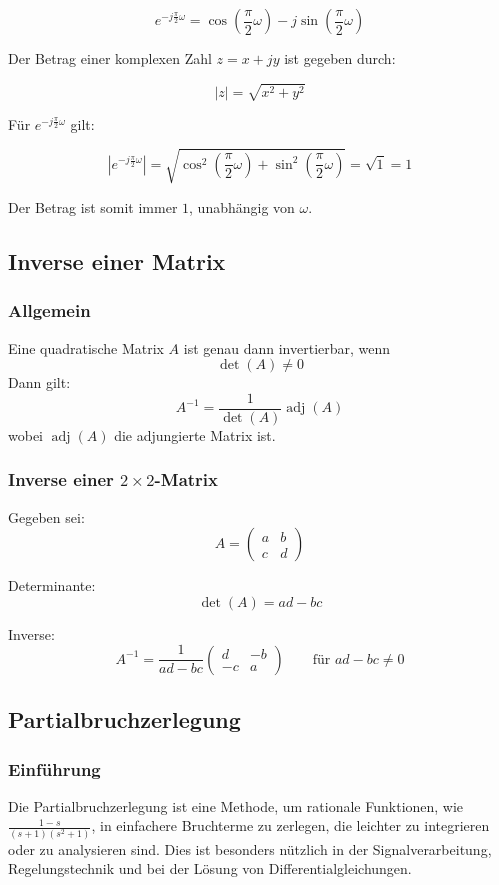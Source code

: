 \documentclass[12pt]{article}
\begin{document}
\[
e^{-j \frac{\pi}{2} \omega} = \cos\left(\frac{\pi}{2} \omega\right) - j \sin\left(\frac{\pi}{2} \omega\right)
\]

Der Betrag einer komplexen Zahl \(z = x + jy\) ist gegeben durch:

\[
|z| = \sqrt{x^2 + y^2}
\]

Für \(e^{-j \frac{\pi}{2} \omega}\) gilt:

\[
|e^{-j \frac{\pi}{2} \omega}| = \sqrt{\cos^2\left(\frac{\pi}{2} \omega\right) + \sin^2\left(\frac{\pi}{2} \omega\right)} = \sqrt{1} = 1
\]

Der Betrag ist somit immer \(1\), unabhängig von \(\omega\).

\subsection{Inverse einer Matrix}

\subsubsection{Allgemein}
Eine quadratische Matrix \(A\) ist genau dann invertierbar, wenn
\[
\det(A) \neq 0
\]
Dann gilt:
\[
A^{-1} = \frac{1}{\det(A)} \operatorname{adj}(A)
\]
wobei \(\operatorname{adj}(A)\) die adjungierte Matrix ist.

\subsubsection{Inverse einer \(2 \times 2\)-Matrix}

Gegeben sei:
\[
A = \begin{pmatrix}
	a & b \\
	c & d
\end{pmatrix}
\]

Determinante:
\[
\det(A) = ad - bc
\]

Inverse:
\[
A^{-1} =
\frac{1}{ad - bc}
\begin{pmatrix}
	d & -b \\
	-c & a
\end{pmatrix}
\qquad \text{für } ad - bc \neq 0
\]

\subsection{Partialbruchzerlegung}

\subsubsection{Einführung}
Die Partialbruchzerlegung ist eine Methode, um rationale Funktionen, wie \(\frac{1 - s}{(s + 1)(s^2 + 1)}\), in einfachere Bruchterme zu zerlegen, die leichter zu integrieren oder zu analysieren sind. Dies ist besonders nützlich in der Signalverarbeitung, Regelungstechnik und bei der Lösung von Differentialgleichungen.
\end{document}
